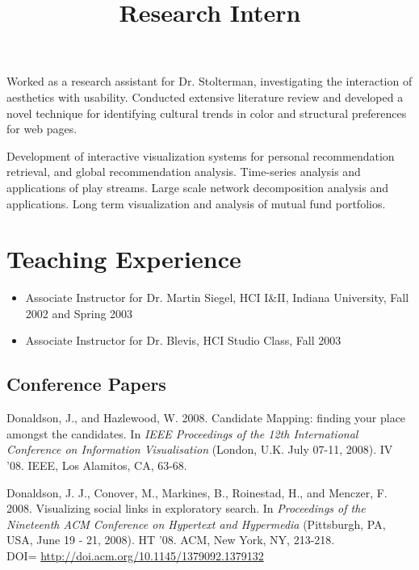 \documentclass[overlapped,line,letterpaper]{res}
\begin{document}
\begin{resume}
\begin{position}
Worked as a research assistant for Dr. Stolterman, investigating the interaction of aesthetics with usability.  Conducted extensive literature review and developed a novel technique for identifying cultural trends in color and structural preferences for web pages.
\end{position}


\title{Research Intern}
\begin{position}
  Development of interactive visualization systems for personal recommendation retrieval, and global recommendation analysis.  Time-series analysis and applications of play streams.  Large scale network decomposition analysis and applications.  Long term visualization and analysis of mutual fund portfolios.
\end{position}


\section{\bf Teaching Experience}

\begin{itemize}
\item Associate Instructor for Dr. Martin Siegel, HCI I\&II, Indiana University, Fall 2002 and Spring 2003
\item Associate Instructor for Dr. Blevis, HCI Studio Class, Fall 2003
\end{itemize}


\subsection{\bf Conference Papers}
Donaldson, J., and Hazlewood, W. 2008. Candidate Mapping: finding your place amongst the candidates. In \emph{IEEE Proceedings of the 12th International Conference on Information Visualisation} (London, U.K. July 07-11, 2008). IV '08. IEEE, Los Alamitos, CA, 63-68.

Donaldson, J. J., Conover, M., Markines, B., Roinestad, H., and Menczer, F. 2008. Visualizing social links in exploratory search. In \emph{Proceedings of the Nineteenth ACM Conference on Hypertext and Hypermedia} (Pittsburgh, PA, USA, June 19 - 21, 2008). HT '08. ACM, New York, NY, 213-218. \\ DOI= \url{http://doi.acm.org/10.1145/1379092.1379132}


\end{resume}
\end{document}
